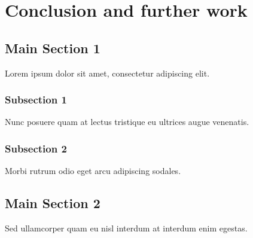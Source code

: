 \chapter{Conclusion and further work}
\label{Conclusion}

\section{Main Section 1}

Lorem ipsum dolor sit amet, consectetur adipiscing elit. 

\subsection{Subsection 1}

Nunc posuere quam at lectus tristique eu ultrices augue venenatis. 


\subsection{Subsection 2}
Morbi rutrum odio eget arcu adipiscing sodales. 


\section{Main Section 2}

Sed ullamcorper quam eu nisl interdum at interdum enim egestas. 